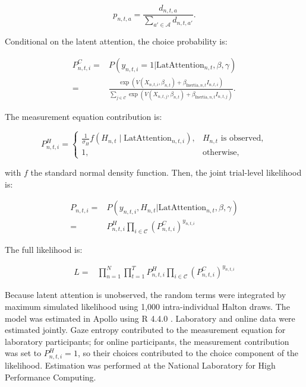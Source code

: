 \documentclass[man,natbib,floatsintext]{apa7}
\begin{document}
\begin{equation}
    p_{n,t,a}=\frac{d_{n,t,a}}{\sum_{a'\in \mathcal{A}}{d_{n,t,a'}}}.
\end{equation}

Conditional on the latent attention, the choice probability is:

\begin{equation} 
\begin{split}
P^C_{n,t,i}=&P(y_{n,t,i}=1|\text{LatAttention}_{n,t},\beta,\gamma) \\
=&\frac{\exp(V(X_{n,t,i}, \beta_{n,t})
+ \beta_{\text{Inertia},n,t} I_{n,t,i})} {\displaystyle\sum_{j\in\mathcal{C}}\exp(V(X_{n,t,j}, \beta_{n,t})
+ \beta_{\text{Inertia},n,t} I_{n,t,j})}.
\end{split}
\end{equation}


The measurement equation contribution is:

\begin{equation} 
P^{H}_{n,t,i} = \begin{cases} \frac{1}{\sigma_H}f\left(H_{n,t}\mid \text{LatAttention}_{n,t,i}\right), & H_{n,t}\text{ is observed},\\ 1, & \text{otherwise},
\end{cases} 
\end{equation}

with $f$ the standard normal density function. Then, the joint trial-level likelihood is:

\begin{equation} 
\begin{split}
P_{n,t,i}=&P(y_{n,t,i},H_{n,t}|\text{LatAttention}_{n,t},\beta,\gamma)\\
    =&P^{H}_{n,t,i}\prod_{i\in \mathcal{C}} (P^{C}_{n,t,i})^{y_{n,t,i}}
\end{split}
\end{equation}

The full likelihood is:

\begin{equation} 
\begin{split}
L=&\prod_{n=1}^N \prod_{t=1}^T P^{H}_{n,t,i}\prod_{i\in \mathcal{C}} (P^{C}_{n,t,i})^{y_{n,t,i}}
\end{split}
\end{equation}

Because latent attention is unobserved, the random terms were integrated by maximum simulated likelihood using 1,000 intra-individual Halton draws. The model was estimated in Apollo \citep{hess2019apollo} using R 4.4.0 \citep{Rcore}. Laboratory and online data were estimated jointly. Gaze entropy contributed to the measurement equation for laboratory participants; for online participants, the measurement contribution was set to $P^H_{n,t,i}=1$, so their choices contributed to the choice component of the likelihood. Estimation was performed at the National Laboratory for High Performance Computing.
\end{document}
